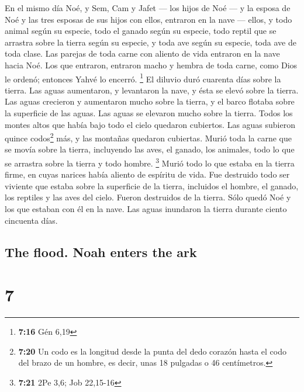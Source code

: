 \begin{paracol}{2}
 En el mismo día Noé, y Sem, Cam y Jafet --- los hijos de
Noé --- y la esposa de Noé y las tres esposas de sus hijos con ellos,
entraron en la nave ---  ellos, y todo animal según su
especie, todo el ganado según su especie, todo reptil que se arrastra
sobre la tierra según su especie, y toda ave según su especie, toda ave
de toda clase.  Las parejas de toda carne con aliento de
vida entraron en la nave hacia Noé.  Los que entraron,
entraron macho y hembra de toda carne, como Dios le ordenó; entonces
Yahvé lo encerró. \footnote{\textbf{7:16} Gén 6,19}  El
diluvio duró cuarenta días sobre la tierra. Las aguas aumentaron, y
levantaron la nave, y ésta se elevó sobre la tierra.  Las
aguas crecieron y aumentaron mucho sobre la tierra, y el barco flotaba
sobre la superficie de las aguas.  Las aguas se elevaron
mucho sobre la tierra. Todos los montes altos que había bajo todo el
cielo quedaron cubiertos.  Las aguas subieron quince
codos\footnote{\textbf{7:20} Un codo es la longitud desde la punta del
  dedo corazón hasta el codo del brazo de un hombre, es decir, unas 18
  pulgadas o 46 centímetros.} más, y las montañas quedaron cubiertas.
 Murió toda la carne que se movía sobre la tierra,
incluyendo las aves, el ganado, los animales, todo lo que se arrastra
sobre la tierra y todo hombre. \footnote{\textbf{7:21} 2Pe 3,6; Job
  22,15-16}  Murió todo lo que estaba en la tierra firme,
en cuyas narices había aliento de espíritu de vida.  Fue
destruido todo ser viviente que estaba sobre la superficie de la tierra,
incluidos el hombre, el ganado, los reptiles y las aves del cielo.
Fueron destruidos de la tierra. Sólo quedó Noé y los que estaban con él
en la nave.  Las aguas inundaron la tierra durante ciento
cincuenta días.

\switchcolumn
\begin{otherlanguage}{english}

\hypertarget{the-flood.-noah-enters-the-ark}{%
\subsection{The flood. Noah enters the
ark}\label{the-flood.-noah-enters-the-ark}}

\hypertarget{section-13}{%
\section{7}\label{section-13}}


\end{otherlanguage}
\end{paracol}
